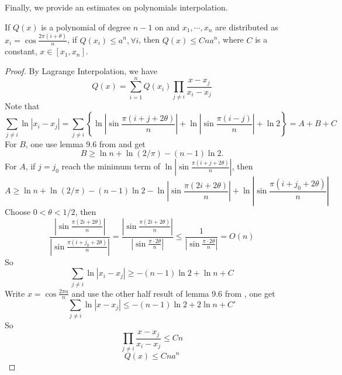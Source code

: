 %

Finally, we provide an estimates on polynomials interpolation.
%
\begin{lemma}\label{elementary}
  If $Q(x)$ is a polynomial of degree $n-1$ on and $x_1,\cdots,x_n$ are distributed as
  $x_i=\cos{\frac{2\pi(i+\theta)}{n}}$, if $Q(x_i)\leq a^n, \forall i$, then $Q(x)\leq Cna^n$, where $C$ is a constant, $x\in[x_1,x_n]$.
\end{lemma}
\begin{proof}
  By Lagrange Interpolation, we have
  \begin{equation}
    Q(x)=\sum_{i=1}^{n}Q(x_i)\prod_{j\neq i}\frac{x-x_j}{x_i-x_j}
  \end{equation}
  Note that
  \[
  \sum_{j\neq i}\ln|x_i-x_j|=\sum_{j\neq i}\left\{\ln\left|\sin\frac{\pi(i+j+2\theta)}{n}\right|+\ln\left|\sin\frac{\pi(i-j)}{n}\right|+\ln 2\right\}= A+B+C
  \]
  For $B$, one use lemma 9.6 from \cite{avila2009ten} and get
  \[
    B\geq \ln n+\ln (2/\pi)-(n-1)\ln 2.
  \]
  For $A$, if $j=j_0$ reach the minimum term of $\ln|\sin\frac{\pi(i+j+2\theta)}{n}|$, then
  \[
    A\geq \ln n+\ln (2/\pi) -(n-1)\ln 2-\ln\left|\sin\frac{\pi(2i+2\theta)}{n}\right|+\ln\left|\sin\frac{\pi(i+j_0+2\theta)}{n}\right|
  \]
  Choose $0<\theta<1/2$, then
  \[
  \frac{|\sin\frac{\pi(2i+2\theta)}{n}|}{|\sin\frac{\pi(i+j_0+2\theta)}{n}|}
  = \frac{|\sin\frac{\pi(2i+2\theta)}{n}|}{|\sin\frac{\pi\cdot 2\theta}{n}|}\leq \frac{1}{|\sin\frac{\pi\cdot 2\theta}{n}|}= O(n)
  \]
  So
  \[
    \sum_{j\neq i}\ln|x_i-x_j|\geq -(n-1)\ln 2+\ln n+C
  \]
  Write $x=\cos\frac{2\pi a}{n}$ and use the other half result of lemma 9.6 from \cite{avila2009ten}, one get
  \[
    \sum_{j\neq i}\ln |x-x_j|\leq -(n-1)\ln 2+ 2\ln n+ C'
  \]
  So
  \[
  \prod_{j\neq i}\frac{x-x_j}{x_i-x_j}\leq Cn
  \]
  \[
  Q(x)\leq Cna^n
  \]
\end{proof}

